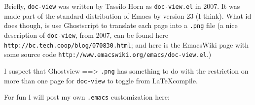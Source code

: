 \documentclass{wpblogentry}
\begin{document}
Briefly, \verb=doc-view= was written by Tassilo Horn as \verb=doc-view.el= in 2007. It was made part of the standard distribution of Emacs by version 23 (I think). What id does though, is use Ghostscript to translate each page into a \verb=.png= file (a nice description of \verb=doc-view=, from 2007, can be found here \verb=http://bc.tech.coop/blog/070830.html=; and here is the EmacsWiki page with some source code \verb=http://www.emacswiki.org/emacs/doc-view.el=.)

I suspect that Ghostview ==> \verb=.png= has something to do with the restriction on more than one page for \verb=doc-view= to toggle from \LaTeX compile.

For fun I will post my own \verb=.emacs= customization here:
\end{document}
